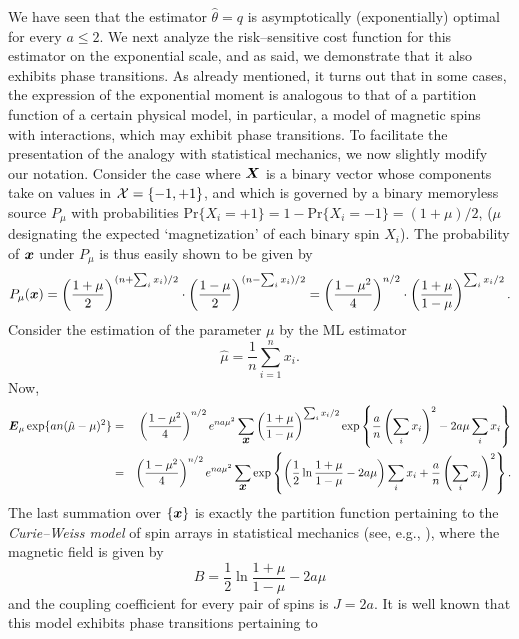 \documentclass[11pt,epsf]{article}
\newcommand{\ct}{\hat{\theta}}
\newcommand {\bx} {\mbox{\boldmath $x$}}
\newcommand {\bE} {\mbox{\boldmath $E$}}
\newcommand {\bX} {\mbox{\boldmath $X$}}
\newcommand{\calX}{{\cal X}}
\begin{document}
We have seen that the estimator $\ct=q$ is asymptotically (exponentially) 
optimal for every $a\le 2$.
We next analyze the risk--sensitive cost function for this estimator on the
exponential scale, and as said, we demonstrate that it also exhibits phase
transitions. As already mentioned, it turns
out that in some cases, the expression of the exponential moment is analogous
to that of a partition function of a certain physical model, in particular, a
model of magnetic
spins with interactions, which may exhibit phase transitions. 
To facilitate
the presentation of the analogy with statistical mechanics, we now slightly
modify our notation.
Consider the case where $\bX$ is a binary vector whose components take
on values in $\calX=\{-1,+1\}$, and which is governed by a binary memoryless
source $P_\mu$ with probabilities
$\mbox{Pr}\{X_i=+1\}=1-\mbox{Pr}\{X_i=-1\}=(1+\mu)/2$, ($\mu$ designating the
expected `magnetization' of each binary spin $X_i$).
The probability of $\bx$ under $P_\mu$ is thus easily
shown to be given by
\begin{equation}
P_\mu(\bx)=\left(\frac{1+\mu}{2}\right)^{(n+\sum_ix_i)/2}\cdot
\left(\frac{1-\mu}{2}\right)^{(n-\sum_ix_i)/2}
=\left(\frac{1-\mu^2}{4}\right)^{n/2}\cdot\left(\frac{1+\mu}{1-\mu}\right)^{\sum_ix_i/2}.
\end{equation}
Consider the estimation of the parameter $\mu$ by the ML estimator
\begin{equation}
\hat{\mu}=\frac{1}{n}\sum_{i=1}^nx_i.
\end{equation}
Now,
\begin{eqnarray}
\bE_\mu\exp\{a n(\hat{\mu}-\mu)^2\}&=&
\left(\frac{1-\mu^2}{4}\right)^{n/2}e^{na\mu^2}
\sum_{\bx}\left(\frac{1+\mu}{1-\mu}\right)^{\sum_ix_i/2}
\exp\left\{\frac{a}{n}\left(\sum_ix_i\right)^2
-2a\mu\sum_ix_i\right\}\nonumber\\
&=&\left(\frac{1-\mu^2}{4}\right)^{n/2} e^{na\mu^2}
\sum_{\bx}\exp\left\{\left(\frac{1}{2}\ln\frac{1+\mu}{1-\mu}-2a\mu\right)\sum_ix_i+
\frac{a}{n}\left(\sum_ix_i\right)^2\right\}.\nonumber
\end{eqnarray}
The last summation over $\{\bx\}$ is exactly the partition function pertaining
to the {\it Curie--Weiss model} of spin arrays in statistical mechanics (see,
e.g.,
\cite[Subsection 2.5.2]{MM09}), where
the magnetic field is given by
\begin{equation}
B=\frac{1}{2}\ln\frac{1+\mu}{1-\mu}-2a\mu
\end{equation}
and the coupling coefficient for every pair of spins is $J=2a$.
It is well known that this model exhibits phase transitions pertaining to
\end{document}
